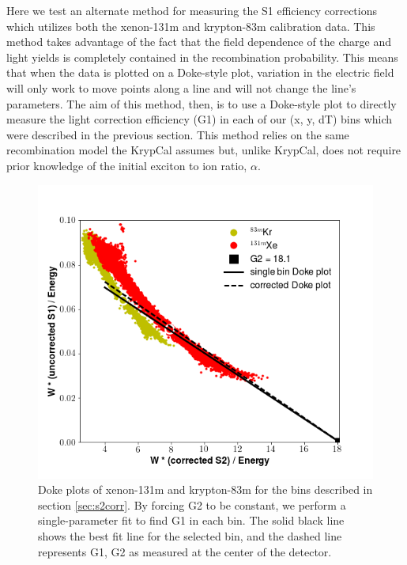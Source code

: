 Here we test an alternate method for measuring the S1 efficiency corrections which utilizes both the xenon-131m and krypton-83m calibration data. This method takes advantage of the fact that the field dependence of the charge and light yields is completely contained in the recombination probability. This means that when the data is plotted on a Doke-style plot, variation in the electric field will only work to move points along a line and will not change the line's parameters. The aim of this method, then, is to use a Doke-style plot to directly measure the light correction efficiency (G1) in each of our (x, y, dT) bins which were described in the previous section. This method relies on the same recombination model the KrypCal assumes but, unlike KrypCal, does not require prior knowledge of the initial exciton to ion ratio, $\alpha$.
\begin{figure}[h!]
\centering
\includegraphics[width=150mm]{Figures/S1corr_singlebin.png}
\caption{Doke plots of xenon-131m and krypton-83m for the bins described in section \ref{sec:s2corr}. By forcing G2 to be constant, we perform a single-parameter fit to find G1 in each bin. The solid black line shows the best fit line for the selected bin, and the dashed line represents G1, G2 as measured at the center of the detector.  }
\label{fig:S1corr_singlebin} 
\end{figure}

